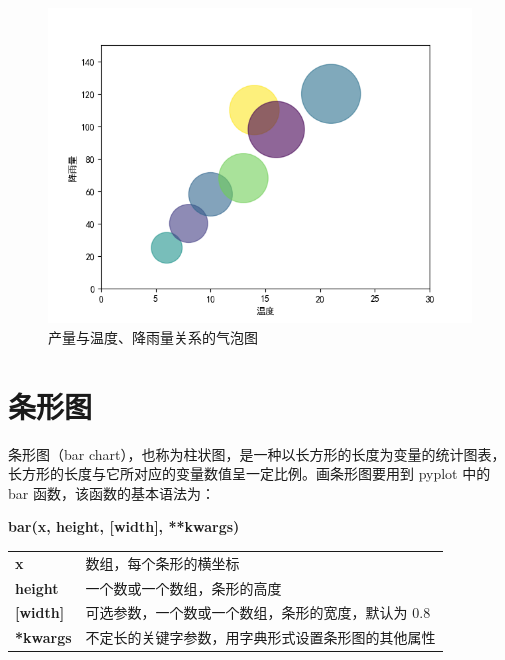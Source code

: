 \begin{figure}[!ht]
  \centering
  \includegraphics{figure/scatter2.png}
  \caption{产量与温度、降雨量关系的气泡图}\label{fig:scatter2}
\end{figure}

\clearpage

\section{条形图}

条形图（bar chart），也称为柱状图，是一种以长方形的长度为变量的统计图表，长方形的长度与它所对应的变量数值呈一定比例。画条形图要用到 pyplot 中的 bar 函数，该函数的基本语法为：

\begin{center}
\begin{tcolorbox}[title = bar 函数的语法]
\textbf{bar(x, height, [width],  **kwargs)}
\tcblower
\vspace{10pt}

\begin{tcboutputlisting}
\begin{tabular}{>{\bfseries}ll}
  x &数组，每个条形的横坐标\\
  height & 一个数或一个数组，条形的高度\\

[width] &可选参数，一个数或一个数组，条形的宽度，默认为 0.8\\

**kwargs &不定长的关键字参数，用字典形式设置条形图的其他属性
\end{tabular}
\end{tcboutputlisting}
\tcbuselistingtext
\end{tcolorbox}
\end{center}

